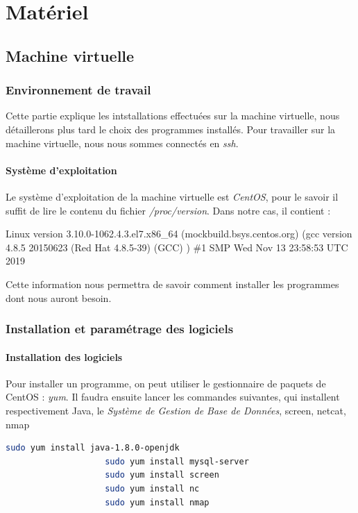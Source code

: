 \documentclass[a4paper, 11pt]{report}
\begin{document}
\chapter{Matériel}
\section{Machine virtuelle}
	\subsection{Environnement de travail}
		Cette partie explique les intstallations effectuées sur la machine virtuelle, nous détaillerons plus tard le choix des programmes installés.
		Pour travailler sur la machine virtuelle, nous nous sommes connectés en \emph{ssh}.
		\subsubsection{Système d'exploitation}
			Le système d'exploitation de la machine virtuelle est \emph{CentOS}, pour le savoir il suffit de lire le contenu du fichier \emph{/proc/version}.
			Dans notre cas, il contient : 
			\begin{mdframed}[backgroundcolor=light-gray, roundcorner=20pt,
				leftmargin=0, rightmargin=0, 
				innerleftmargin=20, linecolor=darkgray]
				Linux version 3.10.0-1062.4.3.el7.x86\_64 (mockbuild\@kbuilder.bsys.centos.org) (gcc version 4.8.5 20150623 (Red Hat 4.8.5-39) (GCC) ) \#1 SMP Wed Nov 13 23:58:53 UTC 2019
			\end{mdframed}
			Cette information nous permettra de savoir comment installer les programmes dont nous auront besoin.
	\subsection{Installation et paramétrage des logiciels}
		\subsubsection{Installation des logiciels}
			Pour installer un programme, on peut utiliser le gestionnaire de paquets de CentOS : \emph{yum}.
			Il faudra ensuite lancer les commandes suivantes, qui installent respectivement Java, le \emph{Système de Gestion de Base de Données}, screen, netcat, nmap
			\begin{mdframed}[backgroundcolor=light-gray, roundcorner=20pt,
				leftmargin=0, rightmargin=0, 
				innerleftmargin=20, linecolor=darkgray]
				\begin{lstlisting}[language=bash]
					sudo yum install java-1.8.0-openjdk
					sudo yum install mysql-server
					sudo yum install screen
					sudo yum install nc
					sudo yum install nmap
				\end{lstlisting}
			\end{mdframed}
\end{document}
